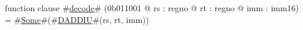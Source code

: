 function clause #\hyperref[zdecode]{decode}# (0b011001 @ rs : regno @ rt : regno @ imm : imm16) =
  #\hyperref[zSome]{Some}#(#\hyperref[zDADDIU]{DADDIU}#(rs, rt, imm))
